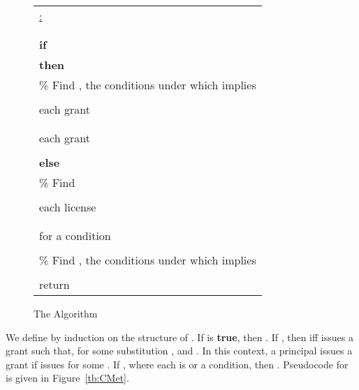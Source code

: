 \documentclass{acmtrans2m}
\newcommand{\<}{
}
\renewcommand{\>}{\rangle}
\newcommand{\vtab}{\phantom{Le}}
\begin{document}
\begin{figure*}[htb]
\begin{center}
\begin{tabular}{|l|}\hline
\underline{:}\\\\
\\
{\bf if} \\
{\bf then} \\
\vtab\% Find , the conditions under which  implies \\
\vtab{\bf if} \\
\vtab\vtab{\bf for} each grant \\
\vtab\vtab\vtab \\
\vtab{\bf if} \\
\vtab\vtab{\bf for} each grant \\
\vtab\vtab\vtab \\
{\bf else} \\
\vtab\% Find \\
\vtab \\
\vtab {\bf for} each license \\
\vtab\vtab \\
\vtab\vtab \\
\vtab\vtab {\bf if}  for a condition \\
\vtab\vtab {\bf then} \\
\vtab\% Find , the conditions under which  implies \\
\vtab \\
return \\
\hline
\end{tabular}
\end{center}
\caption{The  Algorithm}
\label{tb:auth}
\end{figure*}

We define  by induction on the structure of .  If  is {\bf true},
then .  If , then  iff
 issues a grant  such that, for some
substitution ,  and .  In this context,
a principal  issues a grant  if  issues  for some
.  If , where each  is  or
a  condition, then .
Pseudocode for  is given in Figure~\ref{tb:CMet}.
\end{document}
